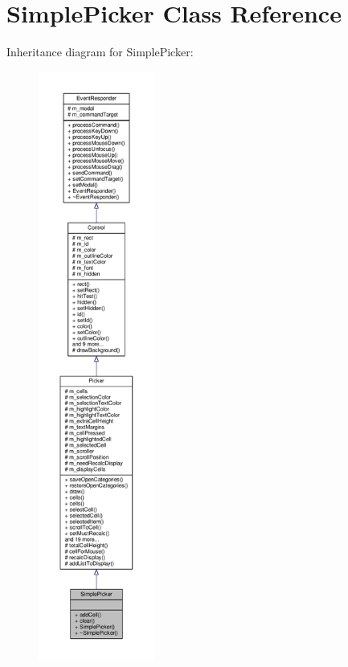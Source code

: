 \hypertarget{classSimplePicker}{}\section{Simple\+Picker Class Reference}
\label{classSimplePicker}


Inheritance diagram for Simple\+Picker\+:
\nopagebreak
\begin{figure}[H]
\begin{center}
\leavevmode
\includegraphics[height=550pt]{df/d10/classSimplePicker__inherit__graph}
\end{center}
\end{figure}


